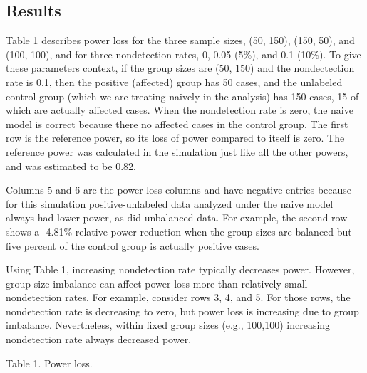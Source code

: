 \documentclass[
]{article}
\begin{document}
\pagebreak

\hypertarget{results-1}{%
\subsection{Results}\label{results-1}}

Table 1 describes power loss for the three sample sizes, (50, 150),
(150, 50), and (100, 100), and for three nondetection rates, 0, 0.05
(5\%), and 0.1 (10\%). To give these parameters context, if the group
sizes are (50, 150) and the nondectection rate is 0.1, then the positive
(affected) group has 50 cases, and the unlabeled control group (which we
are treating naively in the analysis) has 150 cases, 15 of which are
actually affected cases. When the nondetection rate is zero, the naive
model is correct because there no affected cases in the control group.
The first row is the reference power, so its loss of power compared to
itself is zero. The reference power was calculated in the simulation
just like all the other powers, and was estimated to be 0.82.

Columns 5 and 6 are the power loss columns and have negative entries
because for this simulation positive-unlabeled data analyzed under the
naive model always had lower power, as did unbalanced data. For example,
the second row shows a -4.81\% relative power reduction when the group
sizes are balanced but five percent of the control group is actually
positive cases.

Using Table 1, increasing nondetection rate typically decreases power.
However, group size imbalance can affect power loss more than relatively
small nondetection rates. For example, consider rows 3, 4, and 5. For
those rows, the nondetection rate is decreasing to zero, but power loss
is increasing due to group imbalance. Nevertheless, within fixed group
sizes (e.g., 100,100) increasing nondetection rate always decreased
power.

Table 1. Power loss.
\end{document}
